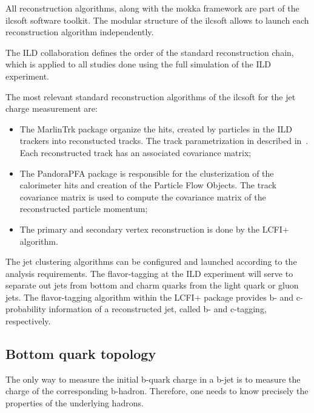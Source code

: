 All reconstruction algorithms, along with the {\sc mokka} framework are part of the {\sc ilcsoft} software toolkit.
The modular structure of the {\sc ilcsoft} allows to  launch each reconstruction algorithm independently. 

The ILD collaboration defines the order of the standard reconstruction chain, which is applied to all studies done using the full simulation of the ILD experiment. 

The most relevant standard reconstruction algorithms of the {\sc ilcsoft} for the jet charge measurement are:
\begin{itemize}
\item The MarlinTrk package organize the hits, created by particles in the ILD trackers into reconstucted tracks. The track parametrization in described in~\cite{bib:LCIOtrack}. Each reconstructed track has an associated covariance matrix;
\item The PandoraPFA package is responsible for the clusterization of the calorimeter hits and creation of the Particle Flow Objects. The track covariance matrix is used to compute the covariance matrix of the reconstructed particle momentum; 
\item The primary and secondary vertex reconstruction is done by the LCFI+ algorithm. 
\end{itemize}
The jet clustering algorithms can be configured and launched according to the analysis requirements. 
The flavor-tagging at the ILD experiment will serve to separate out jets from bottom and charm quarks from the light quark or gluon jets.
The flavor-tagging algorithm within the LCFI+ package provides b- and c-probability information of a reconstructed jet, called b- and c-tagging, respectively.



\subsection{Bottom quark topology}
The only way to measure the initial b-quark charge in a b-jet is to measure the charge of the corresponding b-hadron. 
Therefore, one needs to know precisely the properties of the underlying hadrons. 


